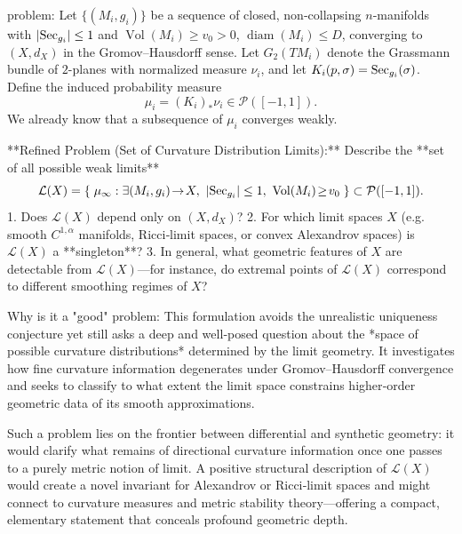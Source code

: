 problem:  
Let $\{(M_i,g_i)\}$ be a sequence of closed, non‑collapsing $n$‑manifolds with $|{\rm Sec}_{g_i}|\le1$ and $\operatorname{Vol}(M_i)\ge v_0>0$, $\operatorname{diam}(M_i)\le D$, converging to $(X,d_X)$ in the Gromov–Hausdorff sense.  
Let $G_2(TM_i)$ denote the Grassmann bundle of \(2\)-planes with normalized measure $\nu_i$, and let \(K_i(p,\sigma)={\rm Sec}_{g_i}(\sigma)\).  Define the induced probability measure
\[
\mu_i=(K_i)_*\nu_i\in\mathcal P([-1,1]).
\]
We already know that a subsequence of $\mu_i$ converges weakly.  

**Refined Problem (Set of Curvature Distribution Limits):**  
Describe the **set of all possible weak limits**
\[
\mathcal L(X)=\{\;\mu_\infty:\exists (M_i,g_i)\!\to\! X,\ |{\rm Sec}_{g_i}|\le1,\ \operatorname{Vol}(M_i)\!\ge\!v_0\;\}
\subset\mathcal P([-1,1]).
\]
1. Does $\mathcal L(X)$ depend only on $(X,d_X)$?  
2. For which limit spaces \(X\) (e.g. smooth \(C^{1,\alpha}\) manifolds, Ricci‑limit spaces, or convex Alexandrov spaces) is $\mathcal L(X)$ a **singleton**?  
3. In general, what geometric features of $X$ are detectable from $\mathcal L(X)$—for instance, do extremal points of $\mathcal L(X)$ correspond to different smoothing regimes of $X$?  

Why is it a "good" problem:  
This formulation avoids the unrealistic uniqueness conjecture yet still asks a deep and well‑posed question about the *space of possible curvature distributions* determined by the limit geometry. It investigates how fine curvature information degenerates under Gromov–Hausdorff convergence and seeks to classify to what extent the limit space constrains higher‑order geometric data of its smooth approximations.  

Such a problem lies on the frontier between differential and synthetic geometry: it would clarify what remains of directional curvature information once one passes to a purely metric notion of limit. A positive structural description of $\mathcal L(X)$ would create a novel invariant for Alexandrov or Ricci‑limit spaces and might connect to curvature measures and metric stability theory—offering a compact, elementary statement that conceals profound geometric depth.